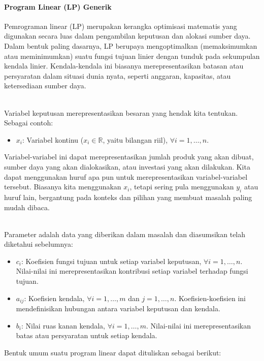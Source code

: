 \paragraph{Program Linear (LP) Generik}

Pemrograman linear (LP) merupakan kerangka optimisasi matematis yang digunakan secara luas dalam pengambilan keputusan dan alokasi sumber daya. Dalam bentuk paling dasarnya, LP berupaya mengoptimalkan (memaksimumkan atau meminimumkan) suatu fungsi tujuan linier dengan tunduk pada sekumpulan kendala linier. Kendala-kendala ini biasanya merepresentasikan batasan atau persyaratan dalam situasi dunia nyata, seperti anggaran, kapasitas, atau ketersediaan sumber daya.

\smallskip {}\\
Variabel keputusan merepresentasikan besaran yang hendak kita tentukan. Sebagai contoh:
\begin{itemize}
    \item $x_i$: Variabel kontinu ($x_i \in \mathbb{R}$, yaitu bilangan riil), $\forall i = 1,\dots,n$.
\end{itemize}
Variabel-variabel ini dapat merepresentasikan jumlah produk yang akan dibuat, sumber daya yang akan dialokasikan, atau investasi yang akan dilakukan. Kita dapat menggunakan huruf apa pun untuk merepresentasikan variabel-variabel tersebut. Biasanya kita menggunakan $x_i$, tetapi sering pula menggunakan $y_i$ atau huruf lain, bergantung pada konteks dan pilihan yang membuat masalah paling mudah dibaca.

\smallskip {}\\
Parameter adalah data yang diberikan dalam masalah dan diasumsikan telah diketahui sebelumnya:
\begin{itemize}
    \item $c_i$: Koefisien fungsi tujuan untuk setiap variabel keputusan, $\forall i = 1,\dots,n$. Nilai-nilai ini merepresentasikan kontribusi setiap variabel terhadap fungsi tujuan.
    \item $a_{ij}$: Koefisien kendala, $\forall i = 1,\dots,m$ dan $j = 1,\dots,n$. Koefisien-koefisien ini mendefinisikan hubungan antara variabel keputusan dan kendala.
    \item $b_i$: Nilai ruas kanan kendala, $\forall i = 1,\dots,m$. Nilai-nilai ini merepresentasikan batas atau persyaratan untuk setiap kendala.
\end{itemize}

Bentuk umum suatu program linear dapat dituliskan sebagai berikut:

